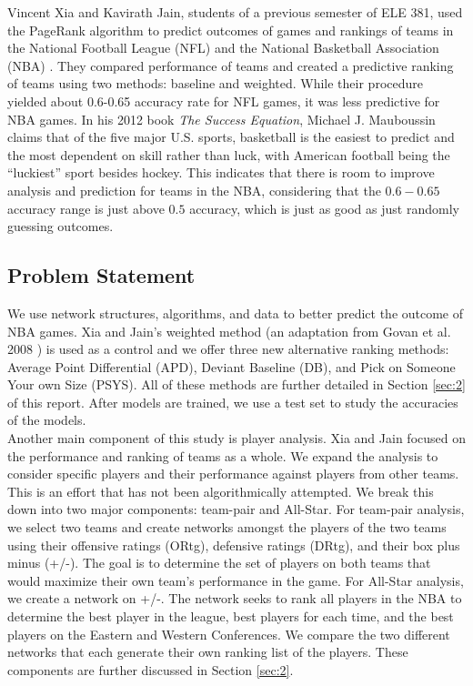 \documentclass[12pt]{article}%
\begin{document}
\null\quad\quad Vincent Xia and Kavirath Jain, students of a previous semester of ELE 381, used the PageRank algorithm to predict outcomes of games and rankings of teams in the National Football League (NFL) and the National Basketball Association (NBA) \cite{XJ}. They compared performance of teams and created a predictive ranking of teams using two methods: baseline and weighted. While their procedure yielded about 0.6-0.65 accuracy rate for NFL games, it was less predictive for NBA games. In his 2012 book \textit{The Success Equation}, Michael J. Mauboussin \cite{nbapredictable} claims that of the five major U.S. sports, basketball is the easiest to predict and the most dependent on skill rather than luck, with American football being the ``luckiest'' sport besides hockey. This indicates that there is room to improve analysis and prediction for teams in the NBA, considering that the $0.6-0.65$ accuracy range is just above $0.5$ accuracy, which is just as good as just randomly guessing outcomes.
\subsection{Problem Statement}
\label{sec:1.2}
\null\quad\quad We use network structures, algorithms, and data to better predict the outcome of NBA games. Xia and Jain's weighted method (an adaptation from Govan et al. 2008 \cite{Govan}) is used as a control and we offer three new alternative ranking methods: Average Point Differential (APD), Deviant Baseline (DB), and Pick on Someone Your own Size (PSYS). All of these methods are further detailed in Section \ref{sec:2} of this report. After models are trained, we use a test set to study the accuracies of the models.\\
\null\quad\quad Another main component of this study is player analysis. Xia and Jain focused on the performance and ranking of teams as a whole. We expand the analysis to consider specific players and their performance against players from other teams. This is an effort that has not been algorithmically attempted. We break this down into two major components: team-pair and All-Star. For team-pair analysis, we select two teams and create networks amongst the players of the two teams using their offensive ratings (ORtg), defensive ratings (DRtg), and their box plus minus (+/-). The goal is to determine the set of players on both teams that would maximize their own team's performance in the game. For All-Star analysis, we create a network on +/-. The network seeks to rank all players in the NBA to determine the best player in the league, best players for each time, and the best players on the Eastern and Western Conferences. We compare the two different networks that each generate their own ranking list of the players. These components are further discussed in Section \ref{sec:2}.
\end{document}
